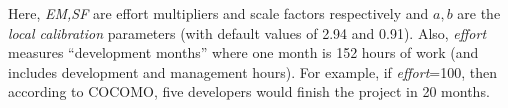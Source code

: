 \documentclass[smallcondesed]{svjour3}
\newcommand{\fig}[1]{Figure~\ref{fig:#1}}
\newcommand{\eq}[1]{Equation~\ref{eq:#1}}
\newenvironment{BLUE}{\color{blue}}{\ignorespacesafterend}
\begin{document}
Here, {\em EM,SF} are  effort multipliers and scale
factors respectively and
 $a,b$ are the {\em local calibration} parameters (with default values of 2.94 and 0.91).
Also, {\em effort}
measures ``development months'' where one month
is 152 hours of work  (and includes development and management hours).
For example, if {\em effort}=100, then according to COCOMO,
five developers would finish
the project in 20 months.








 
\end{document}
